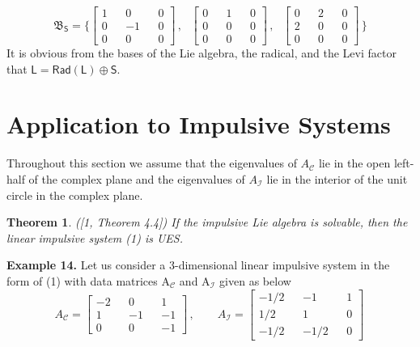 \documentclass[11pt,a4paper]{article}
\newtheorem{theorem}{Theorem}
\begin{document}
$$ \mathfrak{B}_{\mathsf{S}} =
\{
\left[
	   \begin{aligned}
		 1 &&  0 && 0  \\
	 	 0 && -1 && 0  \\
	 	 0 &&  0 && 0
	   \end{aligned}
	  \right]\,, \text{ }
\left[
	   \begin{aligned}
		 0 &&  1 && 0  \\
	 	 0 &&  0 && 0  \\
	 	 0 &&  0 && 0
	   \end{aligned}
	  \right]\,, \text{ }
\left[
	   \begin{aligned}
		 0 &&  2 && 0  \\
	 	 2 &&  0 && 0  \\
	 	 0 &&  0 && 0
	   \end{aligned}
	  \right]\,
\}
$$ 
It is obvious from the bases of the Lie algebra, the radical, and the Levi factor that $\mathsf{L} = \mathsf{Rad}(\mathsf{L}) \oplus \mathsf{S}$. 

%
%
\section{Application to Impulsive Systems}
\qquad Throughout this section we assume that the eigenvalues of $A_\mathcal{C}$ lie in the open left-half of the complex plane and the eigenvalues of $A_\mathcal{I}$ lie in the interior of the unit circle in the complex plane.

\begin{theorem} ([1, Theorem 4.4])  If the impulsive Lie algebra is solvable, then the linear impulsive system (1) is UES.
\end{theorem}

\textbf{Example 14.} Let us consider a 3-dimensional linear impulsive system in the form of (1) with data matrices $\mathrm{A}_\mathcal{C}$ and $\mathrm{A}_\mathcal{I}$ given as below
$$
A_{\mathcal{C}} = 
	\left[
	\begin{aligned}
	-2 &&  0 &&  1  \\
	 1 && -1 && -1  \\
	 0 &&  0 && -1
	\end{aligned}
	\right]\,,
\qquad		
A_{\mathcal{I}} = 
	\left[
	\begin{aligned}
	-1/2 && -1   && 1 \\
	 1/2 &&  1   && 0  \\
	-1/2 && -1/2 && 0
	\end{aligned}
	\right]\,
$$
\end{document}
